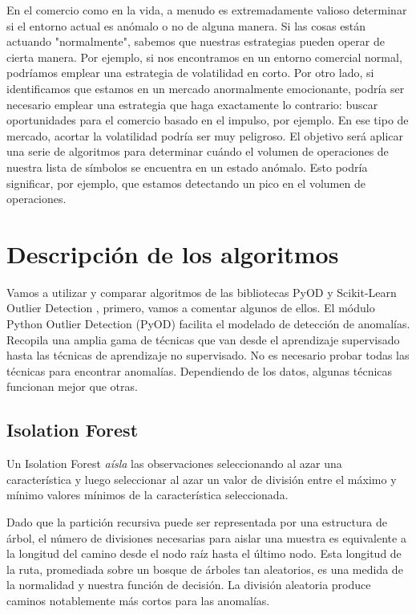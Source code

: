 \documentclass[12pt,twoside]{report}
\begin{document}
En el comercio como en la vida, a menudo es extremadamente valioso determinar si el entorno actual es anómalo o no de alguna manera. Si las cosas están actuando "normalmente", sabemos que nuestras estrategias pueden operar de cierta manera. Por ejemplo, si nos encontramos en un entorno comercial normal, podríamos emplear una estrategia de volatilidad en corto. Por otro lado, si identificamos que estamos en un mercado anormalmente emocionante, podría ser necesario emplear una estrategia que haga exactamente lo contrario: buscar oportunidades para el comercio basado en el impulso, por ejemplo. En ese tipo de mercado, acortar la volatilidad podría ser muy peligroso. El objetivo será aplicar una serie de algoritmos para determinar cuándo el volumen de operaciones de nuestra lista de símbolos se encuentra en un estado anómalo. Esto podría significar, por ejemplo, que estamos detectando un pico en el volumen de operaciones.

\chapter*{Descripción de los algoritmos}

Vamos a utilizar y comparar algoritmos de las bibliotecas PyOD \cite{pyod} y Scikit-Learn Outlier Detection \cite{sklearn}, primero, vamos a comentar algunos de ellos. El módulo Python Outlier Detection (PyOD) facilita el modelado de detección de anomalías. Recopila una amplia gama de técnicas que van desde el aprendizaje supervisado hasta las técnicas de aprendizaje no supervisado. No es necesario probar todas las técnicas para encontrar anomalías. Dependiendo de los datos, algunas técnicas funcionan mejor que otras.

\section*{Isolation Forest}

Un Isolation Forest \textit{aísla} las observaciones seleccionando al azar una característica y luego
seleccionar al azar un valor de división entre el máximo y mínimo valores mínimos de la
característica seleccionada.

Dado que la partición recursiva puede ser representada por una estructura de árbol, el número de
divisiones necesarias para aislar una muestra es equivalente a la longitud del camino desde el
nodo raíz hasta el último nodo.
Esta longitud de la ruta, promediada sobre un bosque de árboles tan aleatorios, es una medida de
la normalidad y nuestra función de decisión.
La división aleatoria produce caminos notablemente más cortos para las anomalías.
\end{document}
